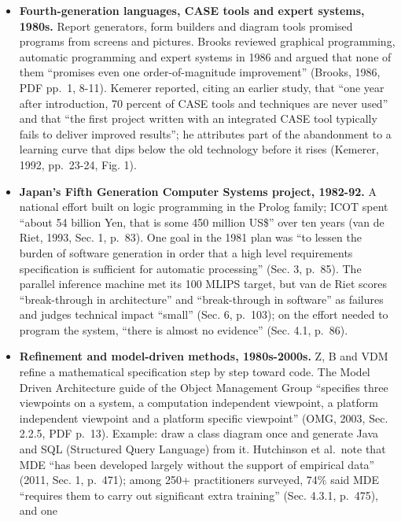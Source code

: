 \documentclass[10pt,letterpaper]{article}
\newcounter{none}
\begin{document}
\begin{itemize}
  segments'' of a list, the direct program takes O(n\^{}3) steps, and
  rewriting with the calculus yields ``a linear time algorithm'' (Sec.
  4.2, PDF p.~34).
\item
  \textbf{Fourth-generation languages, CASE tools and expert systems,
  1980s.} Report generators, form builders and diagram tools promised
  programs from screens and pictures. Brooks reviewed graphical
  programming, automatic programming and expert systems in 1986 and
  argued that none of them ``promises even one order-of-magnitude
  improvement'' (Brooks, 1986, PDF pp.~1, 8-11). Kemerer reported,
  citing an earlier study, that ``one year after introduction, 70
  percent of CASE tools and techniques are never used'' and that ``the
  first project written with an integrated CASE tool typically fails to
  deliver improved results''; he attributes part of the abandonment to a
  learning curve that dips below the old technology before it rises
  (Kemerer, 1992, pp.~23-24, Fig. 1).
\item
  \textbf{Japan's Fifth Generation Computer Systems project, 1982-92.} A
  national effort built on logic programming in the Prolog family; ICOT
  spent ``about 54 billion Yen, that is some 450 million US\$'' over ten
  years (van de Riet, 1993, Sec. 1, p.~83). One goal in the 1981 plan
  was ``to lessen the burden of software generation in order that a high
  level requirements specification is sufficient for automatic
  processing'' (Sec. 3, p.~85). The parallel inference machine met its
  100 MLIPS target, but van de Riet scores ``break-through in
  architecture'' and ``break-through in software'' as failures and
  judges technical impact ``small'' (Sec. 6, p.~103); on the effort
  needed to program the system, ``there is almost no evidence'' (Sec.
  4.1, p.~86).
\item
  \textbf{Refinement and model-driven methods, 1980s-2000s.} Z, B and
  VDM refine a mathematical specification step by step toward code. The
  Model Driven Architecture guide of the Object Management Group
  ``specifies three viewpoints on a system, a computation independent
  viewpoint, a platform independent viewpoint and a platform specific
  viewpoint'' (OMG, 2003, Sec. 2.2.5, PDF p.~13). Example: draw a class
  diagram once and generate Java and SQL (Structured Query Language)
  from it. Hutchinson et al.~note that MDE ``has been developed largely
  without the support of empirical data'' (2011, Sec. 1, p.~471); among
  250+ practitioners surveyed, 74\% said MDE ``requires them to carry
  out significant extra training'' (Sec. 4.3.1, p.~475), and one

\end{itemize}
\end{document}
